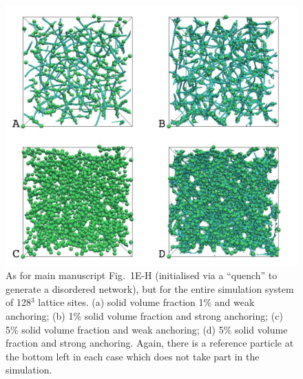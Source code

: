 \documentclass[12pt,twoside]{article}
\begin{document}
\begin{figure}
\includegraphics[scale=0.35]{s2.jpg}
\caption{As for main manuscript Fig.~1E-H (initialised via a ``quench''
to generate a disordered network), but for the entire simulation
system of 128$^3$ lattice sites. (a) solid volume fraction 1\% and
weak anchoring; (b) 1\% solid volume fraction and strong anchoring;
(c) 5\% solid volume fraction and weak anchoring; (d) 5\% solid
volume fraction and strong anchoring. Again, there is a reference
particle at the bottom left in each case which does not take part
in the simulation.}
\end{figure}
\end{document}
